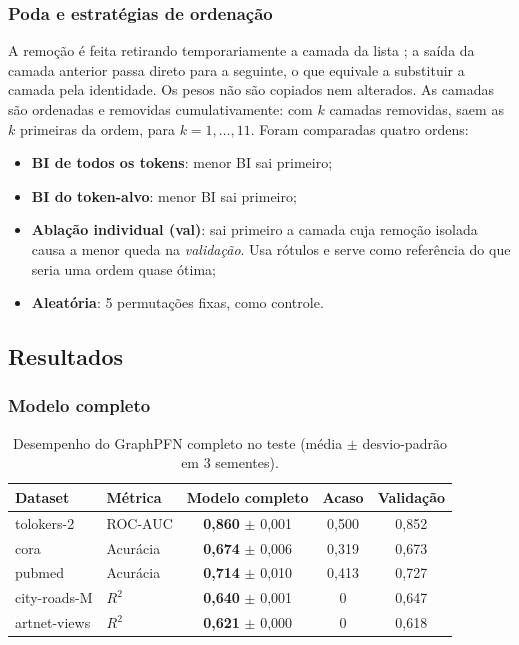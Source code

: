 \documentclass[12pt,a4paper]{article}
\newcommand{\bom}[1]{\textbf{#1}}
\begin{document}
\subsubsection{Poda e estratégias de ordenação}

A remoção é feita retirando temporariamente a camada da lista ; a saída da camada anterior passa direto para a seguinte, o que equivale a substituir a camada pela identidade. Os pesos não são copiados nem alterados. As camadas são ordenadas e removidas cumulativamente: com $k$ camadas removidas, saem as $k$ primeiras da ordem, para $k = 1, \dots, 11$. Foram comparadas quatro ordens:

\begin{itemize}
  \item \textbf{BI de todos os tokens}: menor BI sai primeiro;
  \item \textbf{BI do token-alvo}: menor BI sai primeiro;
  \item \textbf{Ablação individual (val)}: sai primeiro a camada cuja remoção isolada causa a menor queda na \emph{validação}. Usa rótulos e serve como referência do que seria uma ordem quase ótima;
  \item \textbf{Aleatória}: 5 permutações fixas, como controle.
\end{itemize}

\subsection{Resultados}

\subsubsection{Modelo completo}

\begin{table}[H]
\centering
\caption{Desempenho do GraphPFN completo no teste (média $\pm$ desvio-padrão em 3 sementes).}
\label{tab:gpfn-baseline}
\begin{tabular}{@{}llccc@{}}
\toprule
Dataset & Métrica & Modelo completo & Acaso & Validação \\
\midrule
tolokers-2   & ROC-AUC  & \bom{0,860} $\pm$ 0,001 & 0,500 & 0,852 \\
cora         & Acurácia & \bom{0,674} $\pm$ 0,006 & 0,319 & 0,673 \\
pubmed       & Acurácia & \bom{0,714} $\pm$ 0,010 & 0,413 & 0,727 \\
city-roads-M & $R^2$    & \bom{0,640} $\pm$ 0,001 & 0     & 0,647 \\
artnet-views & $R^2$    & \bom{0,621} $\pm$ 0,000 & 0     & 0,618 \\
\bottomrule
\end{tabular}
\end{table}
\end{document}
